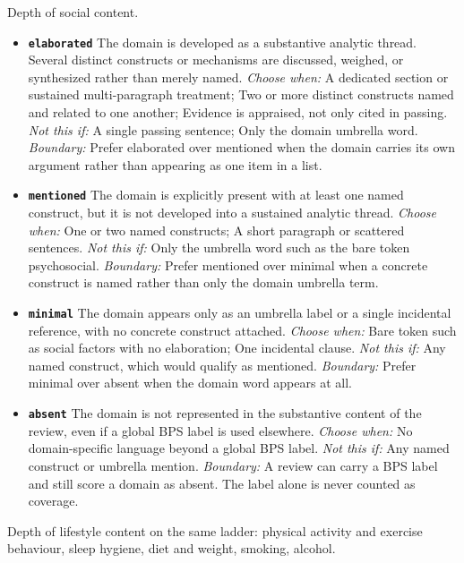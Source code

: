\documentclass[11pt]{article}
\begin{document}
\begin{description}
\begin{itemize}[leftmargin=1.3em,itemsep=2pt,topsep=2pt]
  \end{itemize}
\item[\texttt{domain\_coverage\_social}] Depth of social content.
  \begin{itemize}[leftmargin=1.3em,itemsep=2pt,topsep=2pt]
  \item \textbf{\texttt{elaborated}} The domain is developed as a substantive analytic thread. Several distinct constructs or mechanisms are discussed, weighed, or synthesized rather than merely named. {\small \textit{Choose when:} A dedicated section or sustained multi-paragraph treatment; Two or more distinct constructs named and related to one another; Evidence is appraised, not only cited in passing. \textit{Not this if:} A single passing sentence; Only the domain umbrella word. \textit{Boundary:} Prefer elaborated over mentioned when the domain carries its own argument rather than appearing as one item in a list.}
  \item \textbf{\texttt{mentioned}} The domain is explicitly present with at least one named construct, but it is not developed into a sustained analytic thread. {\small \textit{Choose when:} One or two named constructs; A short paragraph or scattered sentences. \textit{Not this if:} Only the umbrella word such as the bare token psychosocial. \textit{Boundary:} Prefer mentioned over minimal when a concrete construct is named rather than only the domain umbrella term.}
  \item \textbf{\texttt{minimal}} The domain appears only as an umbrella label or a single incidental reference, with no concrete construct attached. {\small \textit{Choose when:} Bare token such as social factors with no elaboration; One incidental clause. \textit{Not this if:} Any named construct, which would qualify as mentioned. \textit{Boundary:} Prefer minimal over absent when the domain word appears at all.}
  \item \textbf{\texttt{absent}} The domain is not represented in the substantive content of the review, even if a global BPS label is used elsewhere. {\small \textit{Choose when:} No domain-specific language beyond a global BPS label. \textit{Not this if:} Any named construct or umbrella mention. \textit{Boundary:} A review can carry a BPS label and still score a domain as absent. The label alone is never counted as coverage.}
  \end{itemize}
\item[\texttt{coverage\_lifestyle}] Depth of lifestyle content on the same ladder: physical activity and exercise behaviour, sleep hygiene, diet and weight, smoking, alcohol.

\end{description}
\end{document}
